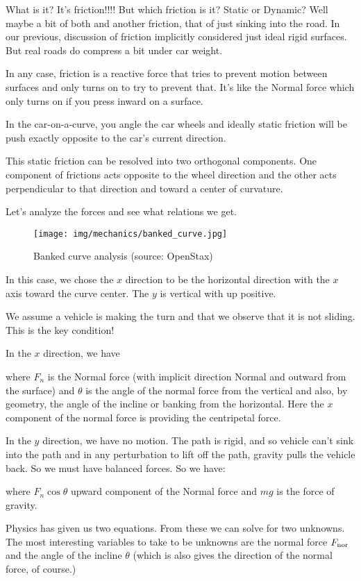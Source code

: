      What is it? It's friction!!!! But which friction is it?  Static or Dynamic? Well maybe a bit of both and another friction, that of just
sinking into the road. In our previous, discussion of friction implicitly considered just ideal rigid surfaces. But real roads do compress a bit under car weight.

     In any case, friction is a reactive force that tries to prevent
motion between surfaces and only turns on to try to prevent that.
It's like the Normal force which only turns on if you press inward
on a surface.

     In the car-on-a-curve, you angle the car wheels and ideally
static friction will be push exactly opposite to the car's current direction.

   This static friction can be resolved into two orthogonal components.
One component of frictions acts opposite to the wheel direction and
the other acts perpendicular to that direction and toward a 
center of curvature.

     Let's analyze the forces and see what relations we get.
	\begin{figure}[H]
		\centering
		\texttt{[image: img/mechanics/banked\_curve.jpg]}
		\caption{Banked curve analysis (source: OpenStax)}
	\end{figure}
      In this case, we chose the $x$ direction to be the horizontal direction with the $x$ axis toward the curve center. The $y$ is vertical with up positive.

      We assume a vehicle is making the turn and that we observe that it is not sliding. This is the key condition!

     In the $x$ direction, we have
	
	where $F_{n}$ is the Normal force (with implicit direction Normal and outward from the surface) and $\theta$ is the angle of the normal force from the vertical and also, by geometry, the angle of the incline or banking from the horizontal. Here the $x$ component of the normal force is providing the centripetal force.
      
     In the $y$ direction, we have no motion. The path is rigid, and so vehicle can't sink into the path and in any perturbation to lift off the path, gravity pulls the vehicle back. So we must have balanced forces. So we have:
	
	where $F_{n}\cos\theta$ upward component of the Normal force and $mg$ is the force of gravity.

    Physics has given us two equations. From these we can solve for two unknowns. The most interesting variables to take to be unknowns are the
normal force $F_{\rm nor}$ and the angle of the incline $\theta$
(which is also gives the direction of the normal force, of course.) 
   
